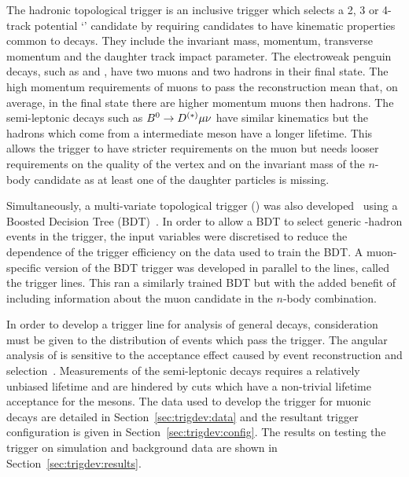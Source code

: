 The hadronic topological trigger is an inclusive trigger which selects a 2, 3 or 4-track potential `\B' candidate by requiring candidates to have kinematic properties common to \B decays. 
They include the invariant mass,  momentum,  transverse momentum and the daughter track impact parameter.
The electroweak penguin decays, such as \BdToKstmm and \BsToPhimm, have two muons and two hadrons in their final state.
The high momentum requirements of muons to pass the \lhcb reconstruction mean that, on average, in the final state there are higher momentum muons then hadrons.
The semi-leptonic \B decays such as $B^0\rightarrow D^{(*)}\mu\nu$ have similar kinematics but the hadrons which come from a 
intermediate \D meson have a longer lifetime.
This allows the trigger to have  stricter requirements on the muon but needs looser requirements on the quality of the \B vertex 
and on the invariant mass of the $n$-body candidate as at least one of the daughter particles is missing.

Simultaneously, a multi-variate topological trigger (\hlttwotopo) was also developed~\cite{Williams:1323557,Gligorov:1384380} 
using a Boosted Decision Tree (BDT)~\cite{Breiman,Roe,AdaBoost}.
In order to allow a BDT to select generic \bquark-hadron events in the trigger, the input variables were discretised to reduce 
 the dependence of the trigger efficiency on the data used to train the BDT.
A muon-specific version of the BDT trigger was developed in parallel to the \muntrack lines, called the \mutopo trigger lines.
This ran a similarly trained BDT but with the added benefit of including information about the muon candidate in the $n$-body combination.

In order to develop a trigger line for analysis of general \B decays, consideration must be given to the distribution of events which pass the trigger.
The angular analysis of \BdToKstmm is sensitive to the acceptance effect caused by event reconstruction and selection~\cite{Blake:1322186,Serra:1239143}.
Measurements of the semi-leptonic decays requires a relatively unbiased lifetime and are hindered by cuts which have a non-trivial lifetime acceptance for the \D mesons.
The data used to develop the trigger for muonic \B decays are detailed in Section~\ref{sec:trigdev:data} and the resultant trigger configuration is given in Section~\ref{sec:trigdev:config}.
The results on testing the trigger on simulation and background data are shown in Section~\ref{sec:trigdev:results}.

